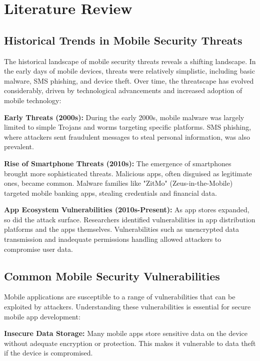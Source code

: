 \documentclass[conference]{IEEEtran}
\begin{document}
\section{Literature Review}

\subsection{Historical Trends in Mobile Security Threats}

The historical landscape of mobile security threats reveals a shifting landscape. In the early days of mobile devices, threats were relatively simplistic, including basic malware, SMS phishing, and device theft. Over time, the threatscape has evolved considerably, driven by technological advancements and increased adoption of mobile technology:

\textbf{Early Threats (2000s):} During the early 2000s, mobile malware was largely limited to simple Trojans and worms targeting specific platforms. SMS phishing, where attackers sent fraudulent messages to steal personal information, was also prevalent.

\textbf{Rise of Smartphone Threats (2010s):} The emergence of smartphones brought more sophisticated threats. Malicious apps, often disguised as legitimate ones, became common. Malware families like "ZitMo" (Zeus-in-the-Mobile) targeted mobile banking apps, stealing credentials and financial data.

\textbf{App Ecosystem Vulnerabilities (2010s-Present):} As app stores expanded, so did the attack surface. Researchers identified vulnerabilities in app distribution platforms and the apps themselves. Vulnerabilities such as unencrypted data transmission and inadequate permissions handling allowed attackers to compromise user data.

\subsection{Common Mobile Security Vulnerabilities}

Mobile applications are susceptible to a range of vulnerabilities that can be exploited by attackers. Understanding these vulnerabilities is essential for secure mobile app development:

\textbf{Insecure Data Storage:} Many mobile apps store sensitive data on the device without adequate encryption or protection. This makes it vulnerable to data theft if the device is compromised.
\end{document}
